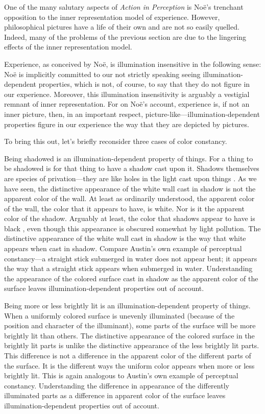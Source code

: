 \documentclass[12pt]{article}
\begin{document}
One of the many salutary aspects of \emph{Action in Perception} is Noë's trenchant opposition to the inner representation model of experience. However, philosophical pictures have a life of their own and are not so easily quelled. Indeed, many of the problems of the previous section are due to the lingering effects of the inner representation model.

Experience, as conceived by Noë, is illumination insensitive in the following sense: Noë is implicitly committed to our not strictly speaking seeing illumina\-tion-dependent properties, which is not, of course, to say that they do not figure in our experience. Moreover, this illumination insensitivity is arguably a vestigial remnant of inner representation. For on Noë's account, experience is, if not an inner picture, then, in an important respect, picture-like---illumination-dependent properties figure in our experience the way that they are depicted by pictures. 

To bring this out, let's briefly reconsider three cases of color constancy.

Being shadowed is an illumination-dependent property of things. For a thing to be shadowed is for that thing to have a shadow cast upon it. Shadows themselves are species of privation---they are like holes in the light cast upon things \citep[see][]{Sorensen:2008kx}. As we have seen, the distinctive appearance of the white wall cast in shadow is not the apparent color of the wall. At least as ordinarily understood, the apparent color of the wall, the color that it appears to have, is white. Nor is it the apparent color of the shadow. Arguably at least, the color that shadows appear to have is black \citep{Sorensen:2008kx}, even though this appearance is obscured somewhat by light pollution. The distinctive appearance of the white wall cast in shadow is the way that white appears when cast in shadow. Compare Austin's \citeyearpar{Austin:1962lr} own example of perceptual constancy---a straight stick submerged in water does not appear bent; it appears the way that a straight stick appears when submerged in water. Understanding the appearance of the colored surface cast in shadow as the apparent color of the surface leaves illumination-dependent properties out of account.

Being more or less brightly lit is an illumination-dependent property of things. When a uniformly colored surface is unevenly illuminated (because of the position and character of the illuminant), some parts of the surface will be more brightly lit than others. The distinctive appearance of the colored surface in the brightly lit parts is unlike the distinctive appearance of the less brightly lit parts. This difference is not a difference in the apparent color of the different parts of the surface. It is the different ways the uniform color appears when more or less brightly lit. This is again analogous to Austin's own example of perceptual constancy. Understanding the difference in appearance of the differently illuminated parts as a difference in apparent color of the surface leaves illumination-dependent properties out of account.
\end{document}
